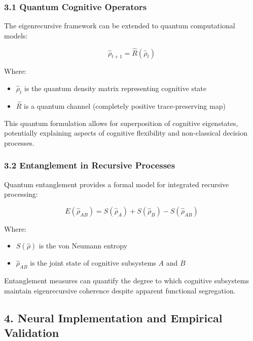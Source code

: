 \documentclass[
]{article}
\providecommand{\tightlist}{%
  \setlength{\itemsep}{0pt}\setlength{\parskip}{0pt}}
\begin{document}
\subsubsection{3.1 Quantum Cognitive
Operators}\label{quantum-cognitive-operators}

The eigenrecursive framework can be extended to quantum computational
models:

\[\hat{\rho}_{t+1} = \hat{R}(\hat{\rho}_t)\]

Where:

\begin{itemize}
\tightlist
\item
  \(\hat{\rho}_t\) is the quantum density matrix representing cognitive
  state
\item
  \(\hat{R}\) is a quantum channel (completely positive trace-preserving
  map)
\end{itemize}

This quantum formulation allows for superposition of cognitive
eigenstates, potentially explaining aspects of cognitive flexibility and
non-classical decision processes.

\subsubsection{3.2 Entanglement in Recursive
Processes}\label{entanglement-in-recursive-processes}

Quantum entanglement provides a formal model for integrated recursive
processing:

\[E(\hat{\rho}_{AB}) = S(\hat{\rho}_A) + S(\hat{\rho}_B) - S(\hat{\rho}_{AB})\]

Where:

\begin{itemize}
\tightlist
\item
  \(S(\hat{\rho})\) is the von Neumann entropy
\item
  \(\hat{\rho}_{AB}\) is the joint state of cognitive subsystems \(A\)
  and \(B\)
\end{itemize}

Entanglement measures can quantify the degree to which cognitive
subsystems maintain eigenrecursive coherence despite apparent functional
segregation.

\subsection{4. Neural Implementation and Empirical
Validation}\label{neural-implementation-and-empirical-validation}
\end{document}
